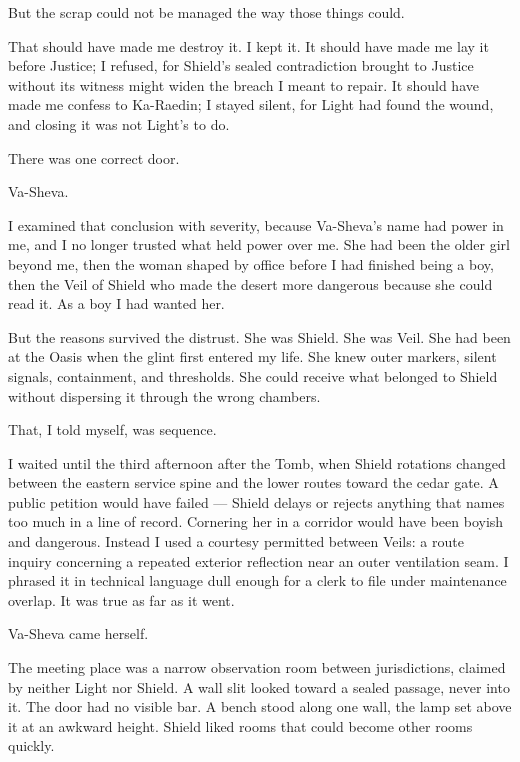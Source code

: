 But the scrap could not be managed the way those things could.\par

That should have made me destroy it. I kept it. It should have made me lay it before Justice; I refused, for Shield's sealed contradiction brought to Justice without its witness might widen the breach I meant to repair. It should have made me confess to Ka-Raedin; I stayed silent, for Light had found the wound, and closing it was not Light's to do.\par

There was one correct door.\par

Va-Sheva.\par

I examined that conclusion with severity, because Va-Sheva's name had power in me, and I no longer trusted what held power over me. She had been the older girl beyond me, then the woman shaped by office before I had finished being a boy, then the Veil of Shield who made the desert more dangerous because she could read it. As a boy I had wanted her.\par

But the reasons survived the distrust. She was Shield. She was Veil. She had been at the Oasis when the glint first entered my life. She knew outer markers, silent signals, containment, and thresholds. She could receive what belonged to Shield without dispersing it through the wrong chambers.\par

That, I told myself, was sequence.\par

\ornament

I waited until the third afternoon after the Tomb, when Shield rotations changed between the eastern service spine and the lower routes toward the cedar gate. A public petition would have failed --- Shield delays or rejects anything that names too much in a line of record. Cornering her in a corridor would have been boyish and dangerous. Instead I used a courtesy permitted between Veils: a route inquiry concerning a repeated exterior reflection near an outer ventilation seam. I phrased it in technical language dull enough for a clerk to file under maintenance overlap. It was true as far as it went.\par

Va-Sheva came herself.\par

The meeting place was a narrow observation room between jurisdictions, claimed by neither Light nor Shield. A wall slit looked toward a sealed passage, never into it. The door had no visible bar. A bench stood along one wall, the lamp set above it at an awkward height. Shield liked rooms that could become other rooms quickly.\par

